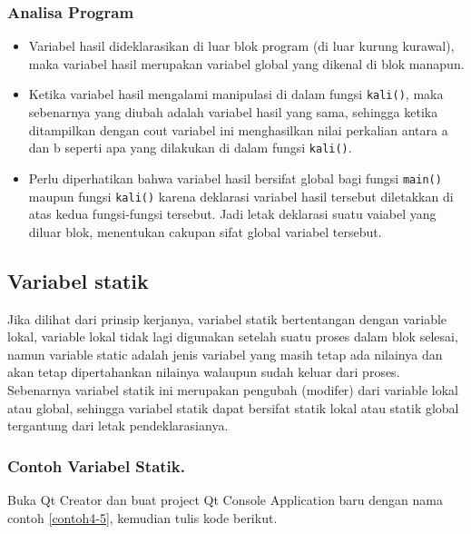 \subsubsection*{Analisa Program}

\begin{itemize}

\item
  Variabel hasil dideklarasikan di luar blok program (di luar kurung
  kurawal), maka variabel hasil merupakan variabel global yang dikenal
  di blok manapun.
\item
  Ketika variabel hasil mengalami manipulasi di dalam fungsi
  \texttt{kali()}, maka sebenarnya yang diubah adalah variabel hasil
  yang sama, sehingga ketika ditampilkan dengan cout variabel ini
  menghasilkan nilai perkalian antara a dan b seperti apa yang dilakukan
  di dalam fungsi \texttt{kali()}.
\item
  Perlu diperhatikan bahwa variabel hasil bersifat global bagi fungsi
  \texttt{main()} maupun fungsi \texttt{kali()} karena deklarasi
  variabel hasil tersebut diletakkan di atas kedua fungsi-fungsi
  tersebut. Jadi letak deklarasi suatu vaiabel yang diluar blok,
  menentukan cakupan sifat global variabel tersebut.
\end{itemize}

\subsection{ Variabel statik}\label{variabel-statik}

Jika dilihat dari prinsip kerjanya, variabel statik bertentangan dengan
variable lokal, variable lokal tidak lagi digunakan setelah suatu proses
dalam blok selesai, namun variable static adalah jenis variabel yang
masih tetap ada nilainya dan akan tetap dipertahankan nilainya walaupun
sudah keluar dari proses. Sebenarnya variabel statik ini merupakan
pengubah (modifer) dari variable lokal atau global, sehingga variabel
statik dapat bersifat statik lokal atau statik global tergantung dari
letak pendeklarasianya.

\subsubsection*{Contoh  Variabel Statik.}

Buka Qt Creator dan buat project Qt Console Application baru dengan nama
contoh \ref{contoh4-5}, kemudian tulis kode berikut.



